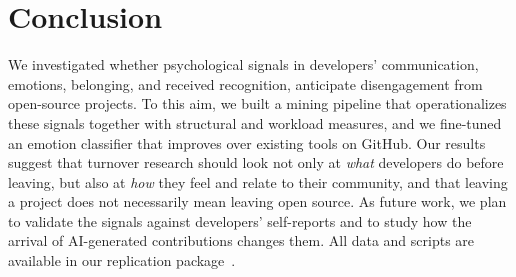\section{Conclusion}
\label{sec:conclusion}

We investigated whether psychological signals in developers' communication, \ie emotions, belonging, and received recognition, anticipate disengagement from open-source projects. To this aim, we built a mining pipeline that operationalizes these signals together with structural and workload measures, and we fine-tuned an emotion classifier that improves over existing tools on GitHub.  Our results suggest that turnover research should look not only at \textit{what} developers do before leaving, but also at \textit{how} they feel and relate to their community, and that leaving a project does not necessarily mean leaving open source. As future work, we plan to validate the signals against developers' self-reports and to study how the arrival of AI-generated contributions changes them. All data and scripts are available in our replication package~\cite{replication}.
